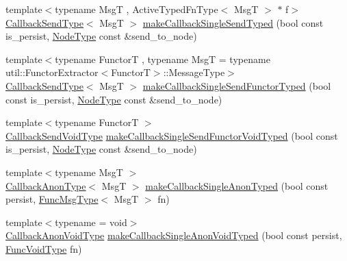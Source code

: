 \begin{DoxyCompactItemize}
\item 
{\footnotesize template$<$typename MsgT , Active\+Typed\+Fn\+Type$<$ Msg\+T $>$ $\ast$ f$>$ }\\\hyperlink{structvt_1_1pipe_1_1_pipe_manager_typed_a306c7c126ed7fb6c5b53bfcf38726291}{Callback\+Send\+Type}$<$ MsgT $>$ \hyperlink{structvt_1_1pipe_1_1_pipe_manager_typed_ac39b55392dbfc09be9f2abe1c68a0e2a}{make\+Callback\+Single\+Send\+Typed} (bool const is\+\_\+persist, \hyperlink{namespacevt_a866da9d0efc19c0a1ce79e9e492f47e2}{Node\+Type} const \&send\+\_\+to\+\_\+node)
\item 
{\footnotesize template$<$typename FunctorT , typename MsgT  = typename util\+::\+Functor\+Extractor$<$\+Functor\+T$>$\+::\+Message\+Type$>$ }\\\hyperlink{structvt_1_1pipe_1_1_pipe_manager_typed_a306c7c126ed7fb6c5b53bfcf38726291}{Callback\+Send\+Type}$<$ MsgT $>$ \hyperlink{structvt_1_1pipe_1_1_pipe_manager_typed_a1e7b6839175c1234110288b549e99145}{make\+Callback\+Single\+Send\+Functor\+Typed} (bool const is\+\_\+persist, \hyperlink{namespacevt_a866da9d0efc19c0a1ce79e9e492f47e2}{Node\+Type} const \&send\+\_\+to\+\_\+node)
\item 
{\footnotesize template$<$typename FunctorT $>$ }\\\hyperlink{structvt_1_1pipe_1_1_pipe_manager_typed_a09eb51f50878116c3b0867fad5f9aab0}{Callback\+Send\+Void\+Type} \hyperlink{structvt_1_1pipe_1_1_pipe_manager_typed_a2bb010b0f35b6587eb65a637443e5243}{make\+Callback\+Single\+Send\+Functor\+Void\+Typed} (bool const is\+\_\+persist, \hyperlink{namespacevt_a866da9d0efc19c0a1ce79e9e492f47e2}{Node\+Type} const \&send\+\_\+to\+\_\+node)
\item 
{\footnotesize template$<$typename MsgT $>$ }\\\hyperlink{structvt_1_1pipe_1_1_pipe_manager_typed_a3723a2c74fb38e4ad6d7aa546e720ae8}{Callback\+Anon\+Type}$<$ MsgT $>$ \hyperlink{structvt_1_1pipe_1_1_pipe_manager_typed_ab09de6a0f8400e1668d4134d24f51bf3}{make\+Callback\+Single\+Anon\+Typed} (bool const persist, \hyperlink{structvt_1_1pipe_1_1_pipe_manager_base_aa54eee64ab32a27777a672d49eb861f4}{Func\+Msg\+Type}$<$ MsgT $>$ fn)
\item 
{\footnotesize template$<$typename  = void$>$ }\\\hyperlink{structvt_1_1pipe_1_1_pipe_manager_typed_ac17133b080980cbe0bc29b285666b2be}{Callback\+Anon\+Void\+Type} \hyperlink{structvt_1_1pipe_1_1_pipe_manager_typed_a306040a3eaa54799594e9a39d8d0a191}{make\+Callback\+Single\+Anon\+Void\+Typed} (bool const persist, \hyperlink{structvt_1_1pipe_1_1_pipe_manager_base_acd6f0c71f38f08d53f85e83b65406d77}{Func\+Void\+Type} fn)

\end{DoxyCompactItemize}
